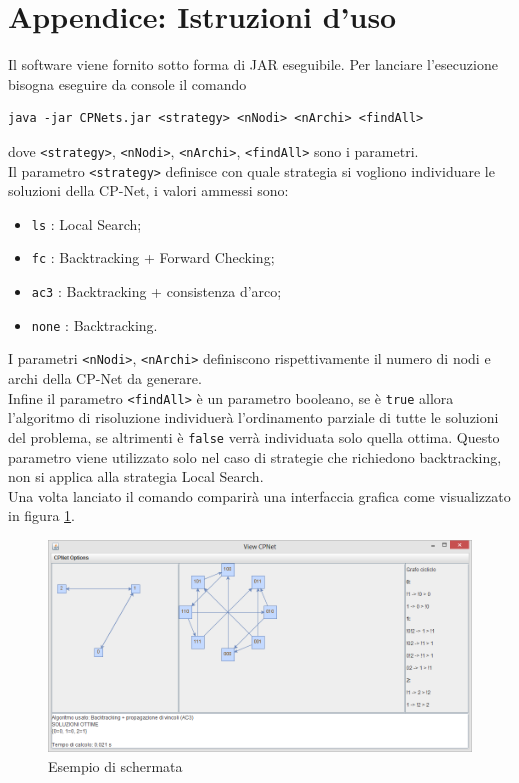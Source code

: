 \documentclass[a4paper,titlepage]{article}
\begin{document}
\section{Appendice: Istruzioni d'uso}
Il software viene fornito sotto forma di JAR eseguibile. Per lanciare l'esecuzione bisogna eseguire da console il comando
\begin{verbatim}
java -jar CPNets.jar <strategy> <nNodi> <nArchi> <findAll>
\end{verbatim}
dove \texttt{<strategy>}, \texttt{<nNodi>}, \texttt{<nArchi>}, \texttt{<findAll>} sono i parametri.\\
Il parametro \texttt{<strategy>} definisce con quale strategia si vogliono individuare le soluzioni della CP-Net, i valori ammessi sono:
\begin{itemize}
\item  \texttt{ls} : Local Search;
\item  \texttt{fc} : Backtracking + Forward Checking;
\item  \texttt{ac3} : Backtracking + consistenza d'arco;
\item  \texttt{none} : Backtracking.
\end{itemize}
I parametri \texttt{<nNodi>}, \texttt{<nArchi>} definiscono rispettivamente il numero di nodi e archi della CP-Net da generare.\\
Infine il parametro \texttt{<findAll>} è un parametro booleano, se è \texttt{true} allora l'algoritmo di risoluzione individuerà l'ordinamento parziale di tutte le soluzioni del problema, se altrimenti è \texttt{false} verrà individuata solo quella ottima. Questo parametro viene utilizzato solo nel caso di strategie che richiedono backtracking, non si applica alla strategia Local Search.\\
Una volta lanciato il comando comparirà una interfaccia grafica come visualizzato in figura \ref{fig:1}.\\
\begin{figure}
\centering
\includegraphics[scale=0.5]{../img/screen.png}
\caption{Esempio di schermata}\label{fig:1}
\end{figure}
\end{document}
